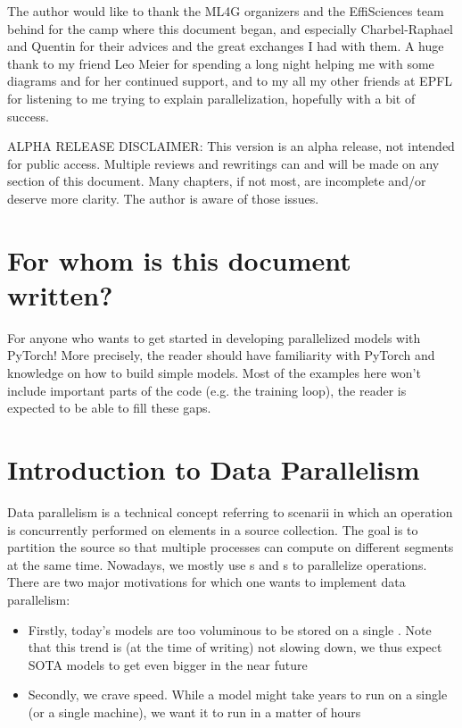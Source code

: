 \documentclass{article}
\begin{document}
The author would like to thank the ML4G organizers and the EffiSciences team behind for the camp where this document began, and especially Charbel-Raphael and Quentin for their advices and the great exchanges I had with them. A huge thank to my friend Leo Meier for spending a long night helping me with some diagrams and for her continued support, and to my all my other friends at EPFL for listening to me trying to explain parallelization, hopefully with a bit of success.

ALPHA RELEASE DISCLAIMER: This version is an alpha release, not intended for public access. Multiple reviews and rewritings can and will be made on any section of this document. Many chapters, if not most, are incomplete and/or deserve more clarity. The author is aware of those issues.

\section{For whom is this document written?}
For anyone who wants to get started in developing parallelized models with PyTorch! More precisely, the reader should have familiarity with PyTorch and knowledge on how to build simple models. Most of the examples here won't include important parts of the code (e.g. the training loop), the reader is expected to be able to fill these gaps.

\clearpage

\section{Introduction to Data Parallelism}
Data parallelism is a technical concept referring to scenarii in which an operation is concurrently performed on elements in a source collection. The goal is to partition the source so that multiple processes can compute on different segments at the same time. Nowadays, we mostly use s and s to parallelize operations. There are two major motivations for which one wants to implement data parallelism:
\begin{itemize}
  \item Firstly, today's models are too voluminous to be stored on a single . Note that this trend is (at the time of writing) not slowing down, we thus expect \Gls{SOTA} models to get even bigger in the near future
  \item Secondly, we crave speed. While a model might take years to run on a single  (or a single machine), we want it to run in a matter of hours
\end{itemize}
\end{document}
